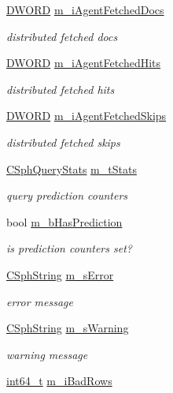 \begin{DoxyCompactItemize}
\hyperlink{sphinxstd_8h_a798af1e30bc65f319c1a246cecf59e39}{D\-W\-O\-R\-D} \hyperlink{classCSphQueryResultMeta_a920c82ad433a09cb0d40fa3aed43c8f3}{m\-\_\-i\-Agent\-Fetched\-Docs}
\begin{DoxyCompactList}\small\item\em distributed fetched docs \end{DoxyCompactList}\item 
\hyperlink{sphinxstd_8h_a798af1e30bc65f319c1a246cecf59e39}{D\-W\-O\-R\-D} \hyperlink{classCSphQueryResultMeta_a67bb36ce07715dfb7cdf204ec2593316}{m\-\_\-i\-Agent\-Fetched\-Hits}
\begin{DoxyCompactList}\small\item\em distributed fetched hits \end{DoxyCompactList}\item 
\hyperlink{sphinxstd_8h_a798af1e30bc65f319c1a246cecf59e39}{D\-W\-O\-R\-D} \hyperlink{classCSphQueryResultMeta_a3ef02b751370172e2d06533ff3877e5a}{m\-\_\-i\-Agent\-Fetched\-Skips}
\begin{DoxyCompactList}\small\item\em distributed fetched skips \end{DoxyCompactList}\item 
\hyperlink{structCSphQueryStats}{C\-Sph\-Query\-Stats} \hyperlink{classCSphQueryResultMeta_a4068160dff2389c2d12d6e54d0cd9411}{m\-\_\-t\-Stats}
\begin{DoxyCompactList}\small\item\em query prediction counters \end{DoxyCompactList}\item 
bool \hyperlink{classCSphQueryResultMeta_a35dd80f8c55d97635cac7c4d822bcd45}{m\-\_\-b\-Has\-Prediction}
\begin{DoxyCompactList}\small\item\em is prediction counters set? \end{DoxyCompactList}\item 
\hyperlink{structCSphString}{C\-Sph\-String} \hyperlink{classCSphQueryResultMeta_a62ab7fe3b8010c9c709143b1a7cd0165}{m\-\_\-s\-Error}
\begin{DoxyCompactList}\small\item\em error message \end{DoxyCompactList}\item 
\hyperlink{structCSphString}{C\-Sph\-String} \hyperlink{classCSphQueryResultMeta_a1efcc451fcdba2ae16e3828aab626cb6}{m\-\_\-s\-Warning}
\begin{DoxyCompactList}\small\item\em warning message \end{DoxyCompactList}\item 
\hyperlink{sphinxstd_8h_a996e72f71b11a5bb8b3b7b6936b1516d}{int64\-\_\-t} \hyperlink{classCSphQueryResultMeta_aeda24c2e70479c5ea25df201aa176148}{m\-\_\-i\-Bad\-Rows}
\end{DoxyCompactItemize}



